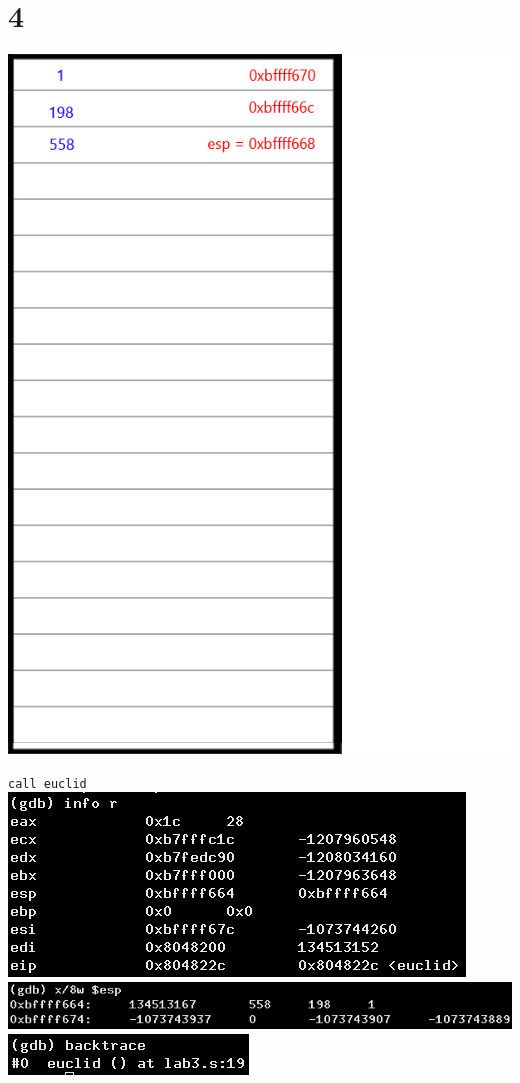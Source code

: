 \documentclass{article}
\begin{document}
\section*{4}
\begin{minipage}{5cm}
\includegraphics[scale=0.3]{s3.png}
\end{minipage}
\begin{minipage}{8cm}
\verb|call euclid|\\
\includegraphics[scale=0.4]{info4.png} \\
\includegraphics[scale=0.3]{x4.png} \\
\includegraphics[scale=0.5]{bt4.png} \\
\end{minipage}
\clearpage
\end{document}
